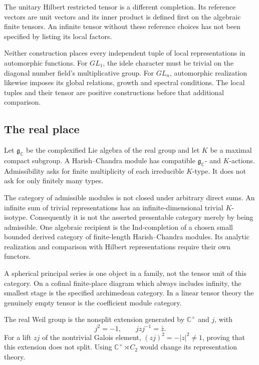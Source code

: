 The unitary Hilbert restricted tensor is a different completion.
Its reference vectors are unit vectors and its inner product is
defined first on the algebraic finite tensors.
An infinite tensor without these reference choices has not been
specified by listing its local factors.

Neither construction places every independent tuple of local
representations in automorphic functions.
For \(GL_1\), the idele character must be trivial on the diagonal
number field's multiplicative group.
For \(GL_n\), automorphic realization likewise imposes its global
relations, growth and spectral conditions.
The local tuples and their tensor are positive constructions
before that additional comparison.

\subsection{The real place}

Let \(\mathfrak g_{\mathbb C}\) be the complexified Lie algebra
of the real group and let \(K\) be a maximal compact subgroup.
A Harish--Chandra module has compatible
\(\mathfrak g_{\mathbb C}\)- and \(K\)-actions. Admissibility asks
for finite multiplicity of each irreducible \(K\)-type.
It does not ask for only finitely many types.

The category of admissible modules is not closed under arbitrary
direct sums. An infinite sum of trivial representations has an
infinite-dimensional trivial \(K\)-isotype.
Consequently it is not the asserted presentable category merely
by being admissible.
One algebraic recipient is the Ind-completion of a chosen small
bounded derived category of finite-length Harish--Chandra modules.
Its analytic realization and comparison with Hilbert representations
require their own functors.

A spherical principal series is one object in a family, not
the tensor unit of this category.
On a cofinal finite-place diagram which always includes infinity,
the smallest stage is the specified archimedean category.
In a linear tensor theory the genuinely empty tensor is the
coefficient module category.

The real Weil group is the nonsplit extension generated by
\(\mathbb C^\times\) and \(j\), with
\[
 j^2=-1,\qquad jzj^{-1}=\bar z.
\]
For a lift \(zj\) of the nontrivial Galois element,
\((zj)^2=-|z|^2\ne1\), proving that this extension does not split.
Using \(\mathbb C^\times\rtimes C_2\) would change its
representation theory.

